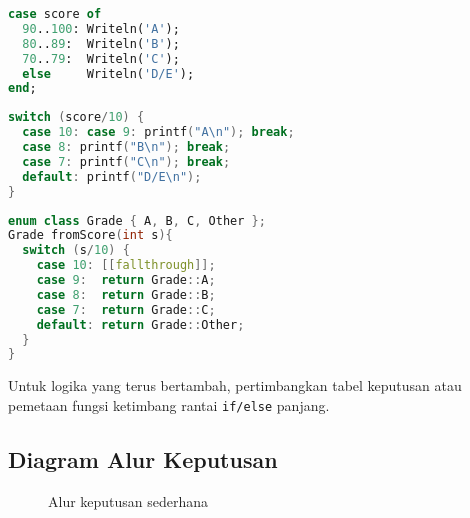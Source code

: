 \documentclass[../main.tex]{subfiles}
\begin{document}
\begin{lstlisting}[language=Pascal, caption={case of dengan rentang}]
case score of
  90..100: Writeln('A');
  80..89:  Writeln('B');
  70..79:  Writeln('C');
  else     Writeln('D/E');
end;
\end{lstlisting}

\begin{lstlisting}[language=C, caption={switch di C dengan break}]
switch (score/10) {
  case 10: case 9: printf("A\n"); break;
  case 8: printf("B\n"); break;
  case 7: printf("C\n"); break;
  default: printf("D/E\n");
}
\end{lstlisting}

\begin{lstlisting}[language=C++, caption={switch modern dengan enum class dan [[fallthrough]]}]
enum class Grade { A, B, C, Other };
Grade fromScore(int s){
  switch (s/10) {
    case 10: [[fallthrough]];
    case 9:  return Grade::A;
    case 8:  return Grade::B;
    case 7:  return Grade::C;
    default: return Grade::Other;
  }
}
\end{lstlisting}

Untuk logika yang terus bertambah, pertimbangkan tabel keputusan atau pemetaan fungsi ketimbang rantai \texttt{if/else} panjang.

\subsection{Diagram Alur Keputusan}
\begin{figure}[h]
  \centering
  \caption{Alur keputusan sederhana}
\end{figure}
\end{document}
